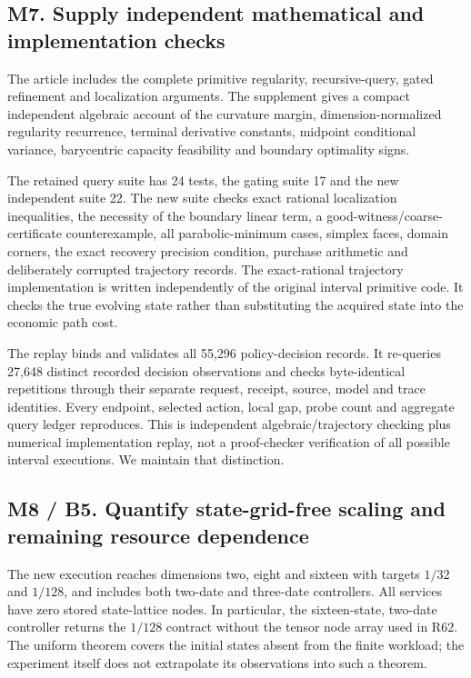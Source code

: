 \hypertarget{m7.-supply-independent-mathematical-and-implementation-checks}{%
\subsection{M7. Supply independent mathematical and implementation
checks}\label{m7.-supply-independent-mathematical-and-implementation-checks}}

The article includes the complete primitive regularity, recursive-query,
gated refinement and localization arguments. The supplement gives a
compact independent algebraic account of the curvature margin,
dimension-normalized regularity recurrence, terminal derivative
constants, midpoint conditional variance, barycentric capacity
feasibility and boundary optimality signs.

The retained query suite has 24 tests, the gating suite 17 and the new
independent suite 22. The new suite checks exact rational localization
inequalities, the necessity of the boundary linear term, a
good-witness/coarse-certificate counterexample, all parabolic-minimum
cases, simplex faces, domain corners, the exact recovery precision
condition, purchase arithmetic and deliberately corrupted trajectory
records. The exact-rational trajectory implementation is written
independently of the original interval primitive code. It checks the
true evolving state rather than substituting the acquired state into the
economic path cost.

The replay binds and validates all 55,296 policy-decision records. It
re-queries 27,648 distinct recorded decision observations and checks
byte-identical repetitions through their separate request, receipt,
source, model and trace identities. Every endpoint, selected action,
local gap, probe count and aggregate query ledger reproduces. This is
independent algebraic/trajectory checking plus numerical implementation
replay, not a proof-checker verification of all possible interval
executions. We maintain that distinction.

\hypertarget{m8-b5.-quantify-state-grid-free-scaling-and-remaining-resource-dependence}{%
\subsection{M8 / B5. Quantify state-grid-free scaling and remaining
resource
dependence}\label{m8-b5.-quantify-state-grid-free-scaling-and-remaining-resource-dependence}}

The new execution reaches dimensions two, eight and sixteen with targets
\(1/32\) and \(1/128\), and includes both two-date and three-date
controllers. All services have zero stored state-lattice nodes. In
particular, the sixteen-state, two-date controller returns the \(1/128\)
contract without the tensor node array used in R62. The uniform theorem
covers the initial states absent from the finite workload; the
experiment itself does not extrapolate its observations into such a
theorem.

